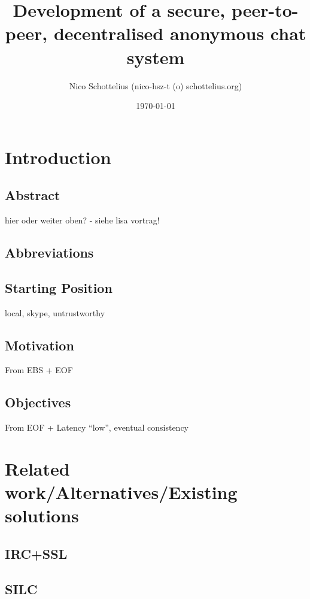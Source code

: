 \documentclass[12pt,a4paper]{article}
\begin{document}
\title{Development of a secure, peer-to-peer, decentralised anonymous chat system}
\date{\today}
\author{Nico Schottelius (nico-hsz-t (o) schottelius.org)}
\maketitle
\newpage
\tableofcontents
\listoftables
\newpage

\section{Introduction}
\subsection{Abstract}
hier oder weiter oben? - siehe lisa vortrag!

\subsection{Abbreviations}
\subsection{Starting Position}
local, skype, untrustworthy

\subsection{Motivation}
From EBS + EOF

\subsection{Objectives}
From EOF + Latency "`low"', eventual consistency

\section{Related work/Alternatives/Existing solutions}
\subsection{IRC+SSL}
\subsection{SILC}
\end{document}
